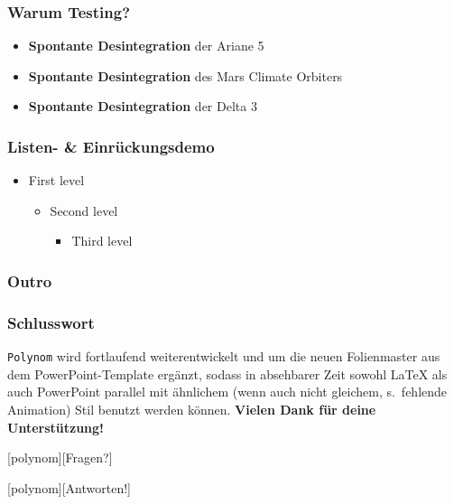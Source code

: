 \documentclass[t]{beamer}
\begin{document}
\begin{frame}
  \frametitle{Warum Testing?}
  \begin{itemize}
    \item \textbf{Spontante Desintegration} der Ariane 5
    \item \textbf{Spontante Desintegration} des Mars Climate Orbiters
    \item \textbf{Spontante Desintegration} der Delta 3
  \end{itemize}
\end{frame}

\begin{frame}
  \frametitle{Listen- \& Einrückungsdemo}
  \begin{itemize}
    \item First level
    \begin{itemize}
      \item Second level
      \begin{itemize}
        \item Third level
      \end{itemize}
    \end{itemize}
  \end{itemize}
\end{frame}

\subsubsection{Outro}

\begin{frame}
  \frametitle{Schlusswort}
  \texttt{Polynom} wird fortlaufend weiterentwickelt und um die neuen Folienmaster aus dem PowerPoint-Template ergänzt, sodass 
  in absehbarer Zeit sowohl \LaTeX{} als auch PowerPoint parallel mit ähnlichem (wenn auch nicht gleichem, s.\ fehlende Animation) Stil
  benutzt werden können.
  \vspace{42pt}
  \textbf{Vielen Dank für deine Unterstützung!}
\end{frame}

[polynom][Fragen?]
\begin{frame}
\end{frame}

[polynom][Antworten!]
\begin{frame}
\end{frame}
\end{document}
